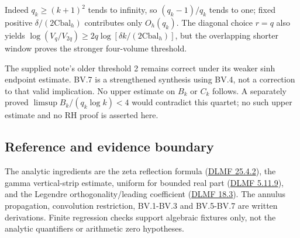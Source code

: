 Indeed \(q_k\ge(k+1)^2\) tends to infinity, so \((q_k-1)/q_k\) tends to one; fixed positive \(\delta/(2\mathrm{Cbal}_h)\) contributes only \(O_h(q_k)\). The diagonal choice \(r=q\) also yields \(\log(V_q/V_{2q})\ge2q\log[\delta k/(2\mathrm{Cbal}_h)]\), but the overlapping shorter window proves the stronger four-volume threshold.

The supplied note's older threshold 2 remains correct under its weaker sinh endpoint estimate. BV.7 is a strengthened synthesis using BV.4, not a correction to that valid implication. No upper estimate on \(B_k\) or \(C_k\) follows. A separately proved \(\limsup B_k/(q_k\log k)<4\) would contradict this quartet; no such upper estimate and no RH proof is asserted here.

\subsection[\hspace{0.4em}Reference and evidence boundary]{Reference and evidence boundary}\label{balanced-window-reference-and-evidence-boundary}

The analytic ingredients are the zeta reflection formula (\href{https://dlmf.nist.gov/25.4.E2}{DLMF 25.4.2}), the gamma vertical-strip estimate, uniform for bounded real part (\href{https://dlmf.nist.gov/5.11.E9}{DLMF 5.11.9}), and the Legendre orthogonality/leading coefficient (\href{https://dlmf.nist.gov/18.3}{DLMF 18.3}). The annulus propagation, convolution restriction, BV.1-BV.3 and BV.5-BV.7 are written derivations. Finite regression checks support algebraic fixtures only, not the analytic quantifiers or arithmetic zero hypotheses.
\endgroup
